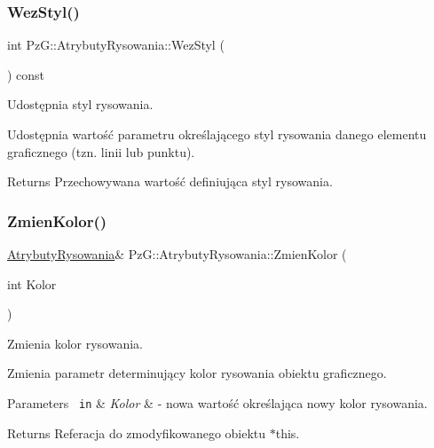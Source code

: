 \subsubsection{\texorpdfstring{WezStyl()}{WezStyl()}}
{\footnotesize\ttfamily int Pz\+G\+::\+Atrybuty\+Rysowania\+::\+Wez\+Styl (\begin{DoxyParamCaption}{ }\end{DoxyParamCaption}) const\hspace{0.3cm}{\ttfamily [inline]}}



Udostępnia styl rysowania. 

Udostępnia wartość parametru określającego styl rysowania danego elementu graficznego (tzn. linii lub punktu). \begin{DoxyReturn}{Returns}
Przechowywana wartość definiująca styl rysowania. 
\end{DoxyReturn}
\mbox{\label{class_pz_g_1_1_atrybuty_rysowania_ab068535b4d2f755c394557d1da72a4eb}} 
\subsubsection{\texorpdfstring{ZmienKolor()}{ZmienKolor()}}
{\footnotesize\ttfamily \mbox{\hyperlink{class_pz_g_1_1_atrybuty_rysowania}{Atrybuty\+Rysowania}}\& Pz\+G\+::\+Atrybuty\+Rysowania\+::\+Zmien\+Kolor (\begin{DoxyParamCaption}\item[{int}]{Kolor }\end{DoxyParamCaption})\hspace{0.3cm}{\ttfamily [inline]}}



Zmienia kolor rysowania. 

Zmienia parametr determinujący kolor rysowania obiektu graficznego. 
\begin{DoxyParams}[1]{Parameters}
\mbox{\texttt{ in}}  & {\em Kolor} & -\/ nowa wartość określająca nowy kolor rysowania. \\
\hline
\end{DoxyParams}
\begin{DoxyReturn}{Returns}
Referacja do zmodyfikowanego obiektu {\ttfamily $\ast$this}. 
\end{DoxyReturn}
\mbox{\label{class_pz_g_1_1_atrybuty_rysowania_af4b140eb03bc10b6fd816fad63f8372e}} 
